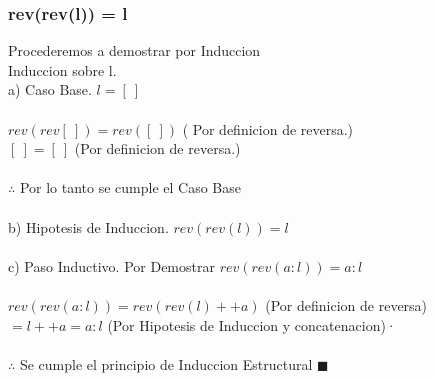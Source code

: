 \documentclass[11pt,letterpaper]{article}
\begin{document}
      \subsubsection{rev(rev(l)) = l}
         Procederemos a demostrar por Induccion\\
         Induccion sobre l.\\
         a) Caso Base. $l = [\ ]$\\ \\
         $rev (rev[\ ]) = rev([\ ])$ \hspace{2cm}( Por definicion de reversa.) \\
         $[\ ] = [\ ]$ \hspace{2cm} (Por definicion de reversa.)\\ \\
         $\therefore$ Por lo tanto se cumple el Caso Base \\ \\
         b) Hipotesis de Induccion. $ rev(rev(l)) =l$\\ \\
         c) Paso Inductivo. Por Demostrar $ rev(rev(a:l)) = a:l$\\ \\
         $ rev(rev(a:l)) = rev(rev(l) + + a)$ \hspace{1cm} (Por definicion de reversa)\\
         $ = l ++ a = a:l$ \hspace{3cm} (Por Hipotesis de Induccion y concatenacion)·\\ \\
         $\therefore$ Se cumple el principio de Induccion Estructural $ \blacksquare$
\end{document}
